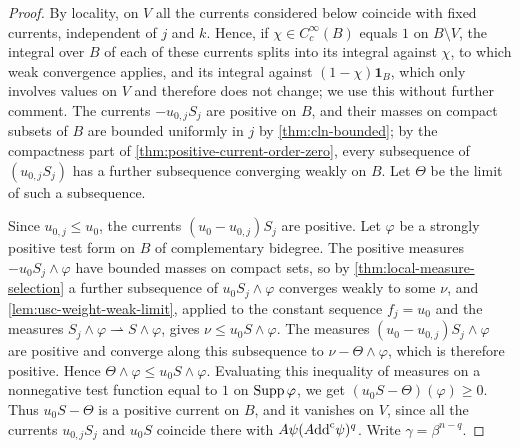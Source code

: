 \begin{proof}
By locality, on $V$ all the currents considered below coincide with fixed currents, independent of $j$ and $k$. Hence, if $\chi\in C^\infty_c(B)$ equals $1$ on $B\setminus V$, the integral over $B$ of each of these currents splits into its integral against $\chi$, to which weak convergence applies, and its integral against $(1-\chi)\mathbf1_B$, which only involves values on $V$ and therefore does not change; we use this without further comment. The currents $-u_{0,j}S_j$ are positive on $B$, and their masses on compact subsets of $B$ are bounded uniformly in $j$ by \cref{thm:cln-bounded}; by the compactness part of \cref{thm:positive-current-order-zero}, every subsequence of $(u_{0,j}S_j)$ has a further subsequence converging weakly on $B$. Let $\Theta$ be the limit of such a subsequence.

Since $u_{0,j}\le u_0$, the currents $(u_0-u_{0,j})S_j$ are positive. Let $\varphi$ be a strongly positive test form on $B$ of complementary bidegree. The positive measures $-u_0S_j\wedge\varphi$ have bounded masses on compact sets, so by \cref{thm:local-measure-selection} a further subsequence of $u_0S_j\wedge\varphi$ converges weakly to some $\nu$, and \cref{lem:usc-weight-weak-limit}, applied to the constant sequence $f_j=u_0$ and the measures $S_j\wedge\varphi\rightharpoonup S\wedge\varphi$, gives $\nu\le u_0S\wedge\varphi$. The measures $(u_0-u_{0,j})S_j\wedge\varphi$ are positive and converge along this subsequence to $\nu-\Theta\wedge\varphi$, which is therefore positive. Hence $\Theta\wedge\varphi\le u_0S\wedge\varphi$. Evaluating this inequality of measures on a nonnegative test function equal to $1$ on $\operatorname{Supp}\varphi$, we get $(u_0S-\Theta)(\varphi)\ge0$. Thus $u_0S-\Theta$ is a positive current on $B$, and it vanishes on $V$, since all the currents $u_{0,j}S_j$ and $u_0S$ coincide there with $A\psi(A\mathrm{dd}^{\mathrm{c}}\psi)^q$. Write $\gamma=\beta^{n-q}$.


\end{proof}
